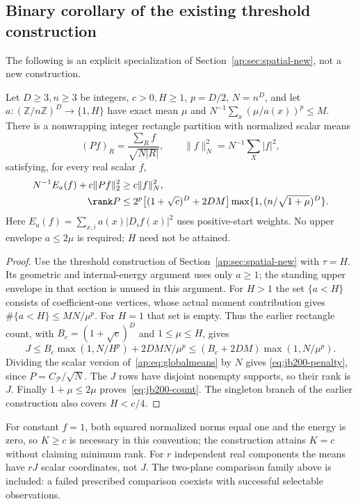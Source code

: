 \subsection{Binary corollary of the existing threshold construction}
The following is an explicit specialization of
Section~\ref{ap:sec:spatial-new}, not a new construction.
\begin{proposition}\label{thm:jb200-binary}
Let $D\ge3,n\ge3$ be integers, $c>0,H\ge1$, $p=D/2$, $N=n^D$,
and let $a:(\mathbb Z/n\mathbb Z)^D\to\{1,H\}$ have exact mean $\mu$
and $N^{-1}\sum_x(\mu/a(x))^p\le M$. There is a nonwrapping integer
rectangle partition with normalized scalar means
\[
 (Pf)_R=\frac{\sum_R f}{\sqrt{N|R|}},\qquad
 \|f\|_N^2=N^{-1}\sum_X|f|^2,
\]
satisfying, for every real scalar $f$,
\begin{align}
 N^{-1}E_a(f)+c\|Pf\|_2^2&\ge c\|f\|_N^2,\label{eq:jb200-penalty}\\
 \rank P&\le2^p\big[(1+\sqrt c)^D+2DM\big]
 \max\{1,(n/\sqrt{1+\mu})^D\}.\label{eq:jb200-count}
\end{align}
Here $E_a(f)=\sum_{x,i}a(x)|D_if(x)|^2$ uses positive-start weights.
No upper envelope $a\le2\mu$ is required; $H$ need not be attained.
\end{proposition}
\begin{proof}
Use the threshold construction of Section~\ref{ap:sec:spatial-new} with
$\tau=H$. Its geometric and internal-energy argument uses only $a\ge1$;
the standing upper envelope in that section is unused in this argument.
For $H>1$ the set $\{a<H\}$ consists of coefficient-one vertices, whose
actual moment contribution gives $\#\{a<H\}\le MN/\mu^p$.
For $H=1$ that set is empty. Thus the earlier rectangle count, with
$B_c=(1+\sqrt c)^D$ and $1\le\mu\le H$, gives
\[
 J\le B_c\max(1,N/H^p)+2DMN/\mu^p
 \le(B_c+2DM)\max(1,N/\mu^p).
\]
Dividing the scalar version of~\eqref{ap:eq:globalmeans} by $N$ gives
\eqref{eq:jb200-penalty}, since $P=C_{\mathcal P}/\sqrt N$.
The $J$ rows have disjoint nonempty supports, so their rank is $J$.
Finally $1+\mu\le2\mu$ proves~\eqref{eq:jb200-count}.
The singleton branch of the earlier construction also covers $H<c/4$.
\end{proof}
For constant $f=1$, both squared normalized norms equal one and the energy
is zero, so $K\ge c$ is necessary in this convention; the construction
attains $K=c$ without claiming minimum rank. For $r$ independent real
components the means have $rJ$ scalar coordinates, not $J$.
The two-plane comparison family above is included: a failed prescribed
comparison coexists with successful selectable observations.

